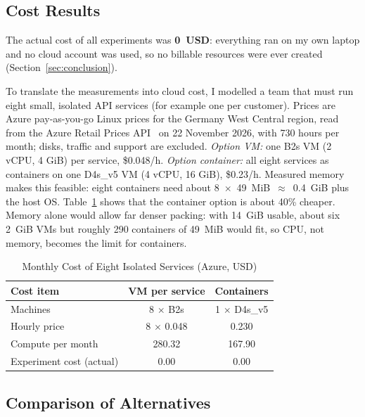 \documentclass[conference,a4paper]{IEEEtran}
\begin{document}
\subsection{Cost Results}

The actual cost of all experiments was \textbf{0~USD}: everything ran on my own laptop and no cloud account was used, so no billable resources were ever created (Section~\ref{sec:conclusion}).

To translate the measurements into cloud cost, I modelled a team that must run eight small, isolated API services (for example one per customer). Prices are Azure pay-as-you-go Linux prices for the Germany West Central region, read from the Azure Retail Prices API~\cite{azureprices} on 22 November 2026, with 730 hours per month; disks, traffic and support are excluded. \emph{Option VM:} one B2s VM (2 vCPU, 4 GiB) per service, \$0.048/h. \emph{Option container:} all eight services as containers on one D4s\_v5 VM (4 vCPU, 16 GiB), \$0.23/h. Measured memory makes this feasible: eight containers need about 8~$\times$~49~MiB~$\approx$~0.4~GiB plus the host OS. Table~\ref{tab:cost} shows that the container option is about 40\% cheaper. Memory alone would allow far denser packing: with 14~GiB usable, about six 2~GiB VMs but roughly 290 containers of 49~MiB would fit, so CPU, not memory, becomes the limit for containers.

\begin{table}[htbp]
	\caption{Monthly Cost of Eight Isolated Services (Azure, USD)}
	\begin{center}
		\footnotesize
		\begin{tabular}{|l|c|c|}
			\hline
			\textbf{Cost item} & \textbf{VM per service} & \textbf{Containers} \\
			\hline
			Machines & 8 $\times$ B2s & 1 $\times$ D4s\_v5 \\
			\hline
			Hourly price & 8 $\times$ 0.048 & 0.230 \\
			\hline
			Compute per month & 280.32 & 167.90 \\
			\hline
			Experiment cost (actual) & 0.00 & 0.00 \\
			\hline
		\end{tabular}
		\label{tab:cost}
	\end{center}
\end{table}

\subsection{Comparison of Alternatives}
\end{document}
